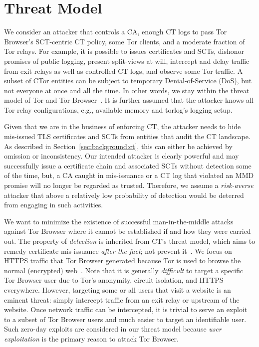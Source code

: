 \section{Threat Model} \label{sec:adversary}
%
%
We consider an attacker that controls
	a CA,
	enough CT logs to pass Tor Browser's SCT-centric CT policy, 
	some Tor clients, and
	a moderate fraction of Tor relays.
For example, it is possible to
	issues certificates and SCTs,
	dishonor promises of public logging,
	present split-views at will,
	intercept and delay traffic from exit relays as well as controlled CT logs,
		and
	observe some Tor traffic.
A subset of CTor entities can be subject to temporary Denial-of-Service (DoS),
but not everyone at once and all the time.  In other words, we stay within the
threat model of Tor and Tor Browser~\cite{tor,tor-browser}.  It is further
assumed that the attacker knows all Tor relay configurations, e.g., available
memory and torlog's logging setup.

%
%
Given that we are in the business of enforcing CT, the attacker needs to hide
mis-issued TLS certificates and SCTs from entities that audit the CT landscape.
As described in Section~\ref{sec:background:ct}, this can either be achieved by
omission or inconsistency.  Our intended attacker is clearly powerful and may
successfully issue a certificate chain and associated SCTs without detection
some of the time, but, a CA caught in mis-issuance or a CT log that violated an
MMD promise will no longer be regarded as trusted.  Therefore, we assume a
\emph{risk-averse} attacker that above a relatively low probability of detection
would be deterred from engaging in such activities.

%
%
We want to minimize the existence of successful man-in-the-middle attacks
against Tor Browser where it cannot be established if
and how they were carried out.  The property of \emph{detection} is inherited
from CT's threat model, which aims to remedy certificate mis-issuance
\emph{after the fact}; not prevent it~\cite{ct/a}.  We
focus on HTTPS traffic that Tor Browser generated because Tor is used to browse
the normal (encrypted) web~\cite{mani}.  Note that it is generally
\emph{difficult} to target a specific Tor Browser user due to Tor's anonymity,
circuit isolation, and HTTPS everywhere.  However, targeting some or all 
users that visit a website is an eminent threat:
	simply intercept traffic from an exit relay or
	upstream of the website.
Once network traffic can be intercepted, it is trivial to serve an exploit to a
subset of Tor Browser users and much easier to target an identifiable user.
Such zero-day exploits are considered in our threat model because \emph{user
exploitation} is the primary reason to attack Tor Browser.

